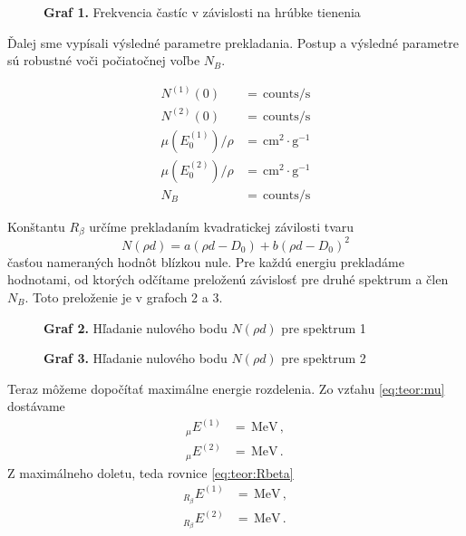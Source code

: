 \documentclass[a4paper, 10pt]{article}
\newcommand{\unit}[1]{\ensuremath{\, \mathrm{#1}}}
\begin{document}
\begin{figure}[h!]
\centering
\vspace*{-15pt}

\textbf{Graf 1.} Frekvencia častíc v závislosti na hrúbke tienenia
\end{figure}

Ďalej sme vypísali výsledné parametre prekladania. Postup a výsledné parametre sú robustné voči počiatočnej voľbe $N_B$. 

\begin{align*}
N^{(1)}(0) &=  \unit{counts/s}\\
N^{(2)}(0) &=  \unit{counts/s}\\
\mu(E^{(1)}_0)/\rho &=  \unit{cm^2\cdot g^{-1}}\\
\mu(E^{(2)}_0)/\rho &=  \unit{cm^2\cdot g^{-1}}\\
N_B &=  \unit{counts/s}
\end{align*}

Konštantu $R_\beta$ určíme prekladaním kvadratickej závilosti tvaru 
$$
N(\rho d) = a (\rho d - D_0) + b (\rho d - D_0)^2
$$
časťou nameraných hodnôt blízkou nule. Pre každú energiu prekladáme hodnotami, od ktorých odčítame preloženú závislosť pre druhé spektrum a člen $N_B$. Toto preloženie je v grafoch 2 a 3.

    
\begin{figure}[h!]
\centering
\vspace*{-15pt}

\textbf{Graf 2.} Hľadanie nulového bodu $N(\rho d)$ pre spektrum 1
\end{figure}

\begin{figure}[h!]
\centering
\vspace*{-15pt}

\textbf{Graf 3.} Hľadanie nulového bodu $N(\rho d)$ pre spektrum 2
\end{figure}

Teraz môžeme dopočítať maximálne energie rozdelenia. Zo vzťahu \ref{eq:teor:mu} dostávame
\begin{align*}
_\mu E^{(1)} &=  \unit{MeV}\,,\\
_\mu E^{(2)} &=  \unit{MeV}\,.
\end{align*}
Z maximálneho doletu, teda rovnice \ref{eq:teor:Rbeta}
\begin{align*}
_{R_\beta} E^{(1)} &=  \unit{MeV}\,,\\
_{R_\beta} E^{(2)} &=  \unit{MeV}\,.
\end{align*}
\end{document}

